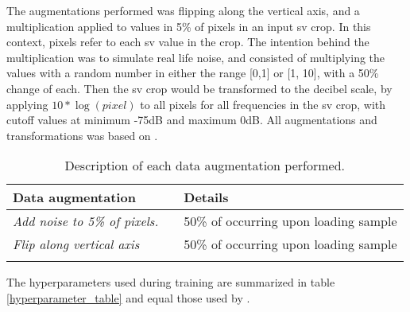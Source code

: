         The augmentations performed was flipping along the vertical axis, and a multiplication applied to values in 5\% of pixels in an input \gls{sv} crop. In this context, pixels refer to each \gls{sv} value in the crop. The intention behind the multiplication was to simulate real life noise, and consisted of multiplying the values with a random number in either the range [0,1] or [1, 10], with a 50\% change of each. Then the \gls{sv} crop would be transformed to the decibel scale, by applying $10*\log{(pixel)}$ to all pixels for all frequencies in the \gls{sv} crop, with cutoff values at minimum -75dB and maximum 0dB. All augmentations and transformations was based on \citeauthor{brautaset2020acoustic}\cite{brautaset2020acoustic}.

        
        \begin{longtable}{lll}

            \caption[Data augmentation summary]{Description of each data augmentation performed.}
            \\\hline
            \multicolumn{2}{|l|}{\textbf{Data augmentation}} & \multicolumn{1}{l|}{\textbf{Details}} \\ \hline
            \endfirsthead
            \endhead
            \textit{Add noise to 5\% of pixels.}      &       & 50\% of occurring upon loading sample \\ \hline
            \textit{Flip along vertical axis}        &       & 50\% of occurring upon loading sample \\ \hline

            \label{data_augmentation_table}
        \end{longtable}
        
        The hyperparameters used during training are summarized in table \ref{hyperparameter_table} and equal those used by \citeauthor{brautaset2020acoustic}\cite{brautaset2020acoustic}.

